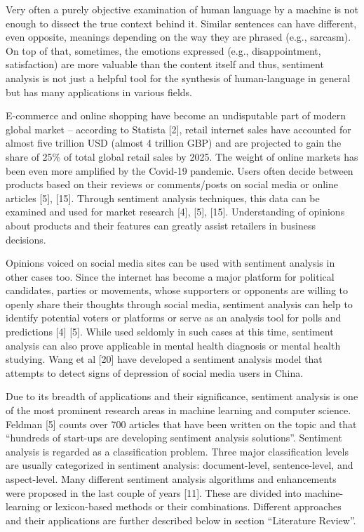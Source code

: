 \documentclass[12pt,journal,compsoc]{IEEEtran}
\begin{document}
Very often a purely objective examination of human language by a machine is not enough to dissect the true context behind it. Similar sentences can have different, even opposite, meanings depending on the way they are phrased (e.g., sarcasm). On top of that, sometimes, the emotions expressed (e.g., disappointment, satisfaction) are more valuable than the content itself and thus, sentiment analysis is not just a helpful tool for the synthesis of human-language in general but has many applications in various fields.

E-commerce and online shopping have become an undisputable part of modern global market – according to Statista [2], retail internet sales have accounted for almost five trillion USD (almost 4 trillion GBP) and are projected to gain the share of 25\% of total global retail sales by 2025. The weight of online markets has been even more amplified by the Covid-19 pandemic. Users often decide between products based on their reviews or comments/posts on social media or online articles [5], [15]. Through sentiment analysis techniques, this data can be examined and used for market research [4], [5], [15]. Understanding of opinions about products and their features can greatly assist retailers in business decisions.

Opinions voiced on social media sites can be used with sentiment analysis in other cases too. Since the internet has become a major platform for political candidates, parties or movements, whose supporters or opponents are willing to openly share their thoughts through social media, sentiment analysis can help to identify potential voters or platforms or serve as an analysis tool for polls and predictions [4] [5].
While used seldomly in such cases at this time, sentiment analysis can also prove applicable in mental health diagnosis or mental health studying. Wang et al [20] have developed a sentiment analysis model that attempts to detect signs of depression of social media users in China.

Due to its breadth of applications and their significance, sentiment analysis is one of the most prominent research areas in machine learning and computer science. Feldman [5] counts over 700 articles that have been written on the topic and that “hundreds of start-ups are developing sentiment analysis solutions”.
Sentiment analysis is regarded as a classification problem. Three major classification levels are usually categorized in sentiment analysis: document-level, sentence-level, and aspect-level. Many different sentiment analysis algorithms and enhancements were proposed in the last couple of years [11]. These are divided into machine-learning or lexicon-based methods or their combinations. Different approaches and their applications are further described below in section “Literature Review”.
\end{document}
